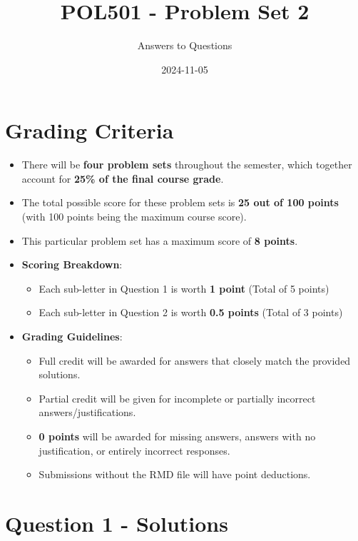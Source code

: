 \documentclass[
  11pt,
]{article}
\title{POL501 - Problem Set 2}
\author{Answers to Questions}
\date{2024-11-05}
\providecommand{\tightlist}{%
  \setlength{\itemsep}{0pt}\setlength{\parskip}{0pt}}
\begin{document}
\maketitle

{
\setcounter{tocdepth}{2}
\tableofcontents
}
\section{Grading Criteria}\label{grading-criteria}

\begin{itemize}
\tightlist
\item
  There will be \textbf{four problem sets} throughout the semester,
  which together account for \textbf{25\% of the final course grade}.
\item
  The total possible score for these problem sets is \textbf{25 out of
  100 points} (with 100 points being the maximum course score).
\item
  This particular problem set has a maximum score of \textbf{8 points}.
\item
  \textbf{Scoring Breakdown}:

  \begin{itemize}
  \tightlist
  \item
    Each sub-letter in Question 1 is worth \textbf{1 point} (Total of 5
    points)
  \item
    Each sub-letter in Question 2 is worth \textbf{0.5 points} (Total of
    3 points)
  \end{itemize}
\item
  \textbf{Grading Guidelines}:

  \begin{itemize}
  \tightlist
  \item
    Full credit will be awarded for answers that closely match the
    provided solutions.
  \item
    Partial credit will be given for incomplete or partially incorrect
    answers/justifications.
  \item
    \textbf{0 points} will be awarded for missing answers, answers with
    no justification, or entirely incorrect responses.
  \item
    Submissions without the RMD file will have point deductions.
  \end{itemize}
\end{itemize}

\newpage

\section{Question 1 - Solutions}\label{question-1---solutions}
\end{document}
